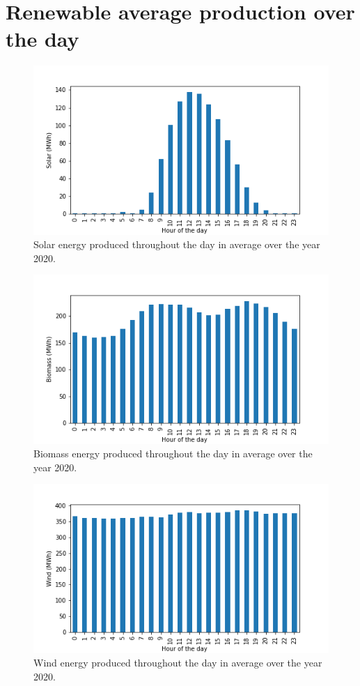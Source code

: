\documentclass[11pt]{article} %
\begin{document}
\clearpage\newpage
\appendix

\section{Renewable average production over the day}\label{app:renewable}
\begin{figure}[h!]
  \includegraphics[width=0.8\linewidth]{../outputs/Solar.png}
  \caption{Solar energy produced throughout the day in average over the year 2020.}
  \label{fig:solar_kwh}
\end{figure}
\begin{figure}[h!]
  \includegraphics[width=0.8\linewidth]{../outputs/Biomass.png}
  \caption{Biomass energy produced throughout the day in average over the year 2020.}
  \label{fig:biomass_kwh}
\end{figure}
\begin{figure}[h!]
  \includegraphics[width=0.8\linewidth]{../outputs/Wind.png}
  \caption{Wind energy produced throughout the day in average over the year 2020.}
  \label{fig:wind_kwh}
\end{figure}
\end{document}
